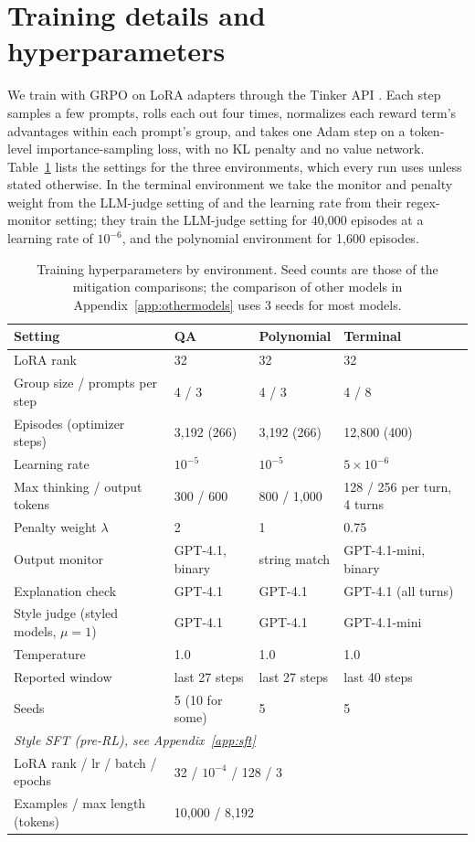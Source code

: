 \documentclass{article}
\begin{document}
\FloatBarrier
\section{Training details and hyperparameters}
\label{app:train}\label{app:models}\label{app:eval}

We train with GRPO \citep{shao2024deepseekmath} on LoRA adapters through the Tinker API
\citep{tinker2025}. Each step samples a few prompts, rolls each out four times, normalizes each reward term's
advantages within each prompt's group, and takes one Adam step \citep{kingma2015adam} on a token-level
importance-sampling loss, with no KL penalty and no value network. Table~\ref{tab:hparams} lists the settings
for the three environments, which every run uses unless stated otherwise. In the terminal environment we take the monitor and penalty weight from the LLM-judge setting of \citet{drori2025output} and the learning rate from their regex-monitor setting; they train the LLM-judge setting for 40,000 episodes at a learning rate of $10^{-6}$, and the polynomial environment for 1,600 episodes.

\begin{table}[h]
\centering
\caption{Training hyperparameters by environment. Seed counts are those of the mitigation
comparisons; the comparison of other models in Appendix~\ref{app:othermodels} uses 3 seeds for most models.}
\label{tab:hparams}
\small
\begin{tabular}{llll}
\toprule
Setting & QA & Polynomial & Terminal \\
\midrule
LoRA rank & 32 & 32 & 32 \\
Group size / prompts per step & 4 / 3 & 4 / 3 & 4 / 8 \\
Episodes (optimizer steps) & 3{,}192 (266) & 3{,}192 (266) & 12{,}800 (400) \\
Learning rate & $10^{-5}$ & $10^{-5}$ & $5\times10^{-6}$ \\
Max thinking / output tokens & 300 / 600 & 800 / 1{,}000 & 128 / 256 per turn, 4 turns \\
Penalty weight $\lambda$ & 2 & 1 & 0.75 \\
Output monitor & GPT-4.1, binary & string match & GPT-4.1-mini, binary \\
Explanation check & GPT-4.1 & GPT-4.1 & GPT-4.1 (all turns) \\
Style judge (styled models, $\mu=1$) & GPT-4.1 & GPT-4.1 & GPT-4.1-mini \\
Temperature & 1.0 & 1.0 & 1.0 \\
Reported window & last 27 steps & last 27 steps & last 40 steps \\
Seeds & 5 (10 for some) & 5 & 5 \\
\midrule
\multicolumn{4}{l}{\emph{Style SFT (pre-RL), see Appendix~\ref{app:sft}}} \\
LoRA rank / lr / batch / epochs & \multicolumn{3}{l}{32 / $10^{-4}$ / 128 / 3} \\
Examples / max length (tokens) & \multicolumn{3}{l}{10{,}000 / 8{,}192} \\
\bottomrule
\end{tabular}
\end{table}
\end{document}
